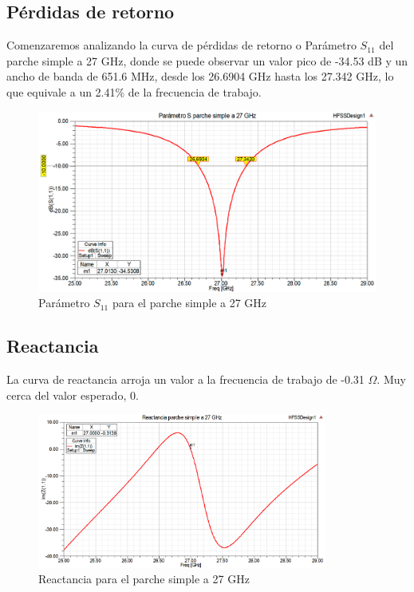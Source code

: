 \subsection{Pérdidas de retorno}
\par Comenzaremos analizando la curva de pérdidas de retorno o Parámetro $S_{11}$ del parche simple a 27 GHz, donde se puede observar un valor pico de -34.53 dB y un ancho de banda de 651.6 MHz, desde los 26.6904 GHz hasta los 27.342 GHz, lo que equivale a un 2.41\% de la frecuencia de trabajo.
\\
\begin{figure}[H]
    \centering
        \includegraphics[width=\textwidth]{archivos/analisis/1x13/1}
        \caption{Parámetro $S_{11}$ para el parche simple a 27 GHz}
        \label{fig:s1x13}
\end{figure}

\subsection{Reactancia}
\par La curva de reactancia arroja un valor a la frecuencia de trabajo de -0.31 $\Omega$. Muy cerca del valor esperado, 0.
\\
\begin{figure}[H]
    \centering
        \includegraphics[width=0.85\textwidth]{archivos/analisis/1x13/2}
        \caption{Reactancia para el parche simple a 27 GHz}
        \label{fig:react1x13}
\end{figure}



